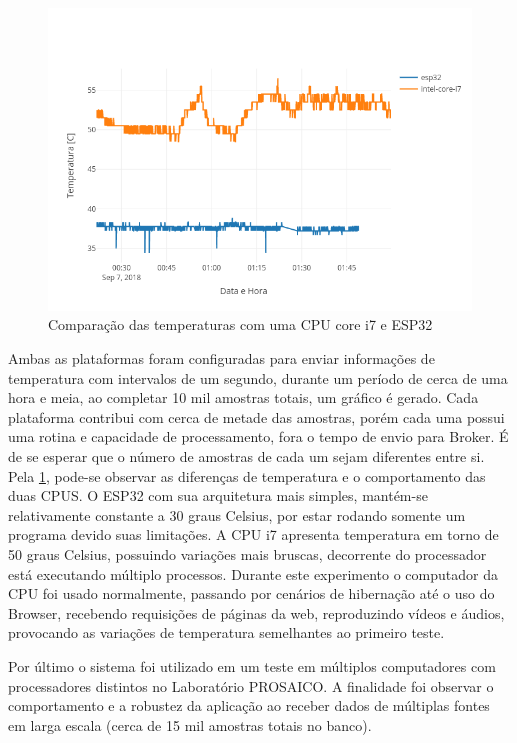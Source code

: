 \begin{figure}[h!]
\centering
\includegraphics[width=16cm]{./02_Capitulos/02_Cap4/figures/temp-device-3}
\caption{Comparação das temperaturas com uma CPU core i7 e ESP32}
\label{fig:temp-devices-3}
\end{figure}

Ambas as plataformas foram configuradas para enviar informações de temperatura com intervalos de um segundo, durante um período de cerca de uma hora e meia, ao completar 10 mil amostras totais, um gráfico é gerado. Cada plataforma contribui com cerca de metade das amostras, porém cada uma possui uma rotina e capacidade de processamento, fora o tempo de envio para Broker. É de se esperar que o número de amostras de cada um sejam diferentes entre si.
Pela \ref{fig:temp-devices-3}, pode-se observar as diferenças de temperatura e o comportamento das duas CPUS. O ESP32 com sua arquitetura mais simples, mantém-se relativamente constante a 30 graus Celsius, por estar rodando somente um programa devido suas limitações.
A CPU i7 apresenta temperatura em torno de 50 graus Celsius, possuindo variações mais bruscas, decorrente do processador está executando múltiplo processos. Durante este experimento o computador da CPU foi usado normalmente, passando por cenários de hibernação até o uso do Browser, recebendo requisições de páginas da web, reproduzindo vídeos e áudios, provocando as variações de temperatura semelhantes ao primeiro teste.


Por último o sistema foi utilizado em um teste em múltiplos computadores com processadores distintos no Laboratório PROSAICO. A finalidade foi observar o comportamento e a robustez da aplicação ao receber dados de múltiplas fontes em larga escala (cerca de 15 mil amostras totais no banco).

